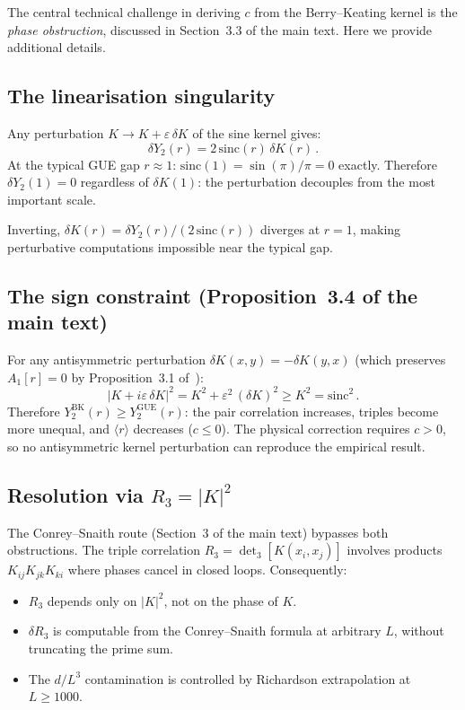 \documentclass[10pt]{article}
\theoremstyle{remark}
\begin{document}
The central technical challenge in deriving $c$ from the Berry--Keating
kernel is the \emph{phase obstruction}, discussed in
Section~3.3 of the main text. Here we provide additional details.

\subsection{The linearisation singularity}

Any perturbation $K \to K + \varepsilon\,\delta K$ of the sine kernel gives:
\begin{equation}
\delta Y_2(r) = 2\,\mathrm{sinc}(r)\,\delta K(r)\,.
\end{equation}
At the typical GUE gap $r \approx 1$: $\mathrm{sinc}(1) = \sin(\pi)/\pi = 0$
exactly. Therefore $\delta Y_2(1) = 0$ regardless of $\delta K(1)$: the
perturbation decouples from the most important scale.

Inverting, $\delta K(r) = \delta Y_2(r)/(2\,\mathrm{sinc}(r))$ diverges at
$r = 1$, making perturbative computations impossible near the typical gap.

\subsection{The sign constraint (Proposition~3.4 of the main text)}

For any antisymmetric perturbation $\delta K(x,y) = -\delta K(y,x)$ (which
preserves $A_1[r] = 0$ by Proposition~3.1 of~\cite{alarcon2026a}):
\begin{equation}
|K + i\varepsilon\,\delta K|^2 = K^2 + \varepsilon^2\,(\delta K)^2
\geq K^2 = \mathrm{sinc}^2\,.
\end{equation}
Therefore $Y_2^{\mathrm{BK}}(r) \geq Y_2^{\mathrm{GUE}}(r)$: the pair
correlation increases, triples become more unequal, and
$\langle r\rangle$ decreases ($c \leq 0$). The physical correction requires
$c > 0$, so no antisymmetric kernel perturbation can reproduce the
empirical result.

\subsection{Resolution via $R_3 = |K|^2$}

The Conrey--Snaith route (Section~3 of the main text) bypasses both
obstructions. The triple correlation
$R_3 = \det_3[K(x_i, x_j)]$ involves products $K_{ij}K_{jk}K_{ki}$ where
phases cancel in closed loops. Consequently:
\begin{itemize}
\item $R_3$ depends only on $|K|^2$, not on the phase of $K$.
\item $\delta R_3$ is computable from the Conrey--Snaith formula at
arbitrary $L$, without truncating the prime sum.
\item The $d/L^3$ contamination is controlled by Richardson extrapolation
at $L \geq 1000$.
\end{itemize}
\end{document}
